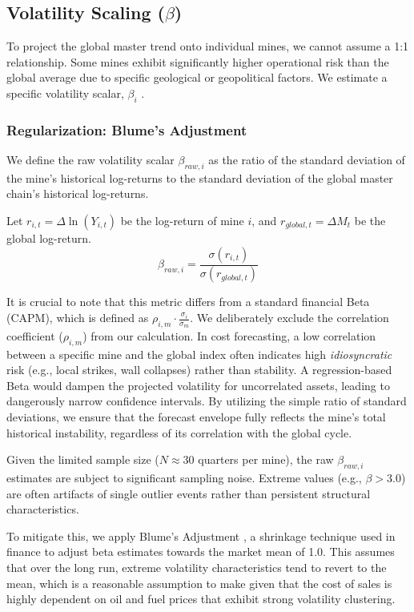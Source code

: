 \subsection{Volatility Scaling (\texorpdfstring{$\beta$}{beta})}
To project the global master trend onto individual mines, we cannot assume a 1:1 relationship. Some mines exhibit significantly higher operational risk than the global average due to specific geological or geopolitical factors. We estimate a specific volatility scalar, $\beta_i$ .
\subsubsection{Regularization: Blume's Adjustment }
We define the raw volatility scalar $\beta_{raw,i}$ as the ratio of the standard deviation of the mine's historical log-returns to the standard deviation of the global master chain's historical log-returns.

Let $r_{i,t} = \Delta \ln(Y_{i,t})$ be the log-return of mine $i$, and $r_{global,t} = \Delta M_t$ be the global log-return.
\[
\beta_{raw,i} = \frac{\sigma(r_{i,t})}{\sigma(r_{global,t})}
\]

It is crucial to note that this metric differs from a standard financial Beta (CAPM), which is defined as $\rho_{i,m} \cdot \frac{\sigma_i}{\sigma_m}$. We deliberately exclude the correlation coefficient ($\rho_{i,m}$) from our calculation. In cost forecasting, a low correlation between a specific mine and the global index often indicates high \textit{idiosyncratic} risk (e.g., local strikes, wall collapses) rather than stability. A regression-based Beta would dampen the projected volatility for uncorrelated assets, leading to dangerously narrow confidence intervals. By utilizing the simple ratio of standard deviations, we ensure that the forecast envelope fully reflects the mine's total historical instability, regardless of its correlation with the global cycle.


Given the limited sample size ($N \approx 30$ quarters per mine), the raw $\beta_{raw,i}$ estimates are subject to significant sampling noise. Extreme values (e.g., $\beta > 3.0$) are often artifacts of single outlier events rather than persistent structural characteristics.

To mitigate this, we apply Blume's Adjustment , a shrinkage technique used in finance to adjust beta estimates towards the market mean of 1.0. This assumes that over the long run, extreme volatility characteristics tend to revert to the mean, which is a reasonable assumption to make given that the cost of sales is highly dependent on oil and fuel prices that exhibit strong volatility clustering.

